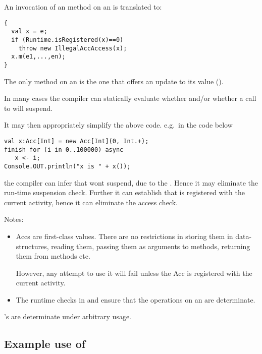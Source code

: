 An invocation  of an  method on an
 is translated to:
\begin{lstlisting}
{
  val x = e;
  if (Runtime.isRegistered(x)==0)
    throw new IllegalAccAccess(x);
  x.m(e1,...,en);
}
\end{lstlisting}

The only  method on an  is the one that offers an
update to its value ().

In many cases the compiler can statically evaluate whether
 and/or whether a call to
  will suspend.

It may then appropriately simplify the above code. e.g.{}~in the code below
\begin{lstlisting}
val x:Acc[Int] = new Acc[Int](0, Int.+);
finish for (i in 0..100000) async
   x <- i;
Console.OUT.println("x is " + x());
\end{lstlisting}
\noindent the compiler can infer that  wont suspend, due to
the . Hence it may eliminate the run-time suspension
check. Further it can establish that  is 
registered with the current activity, hence it can eliminate the
access check.

Notes:
\begin{itemize}
\item
   Accs are first-class values. There are no restrictions in storing
   them in data-structures, reading them, passing them as arguments to
   methods, returning them from methods etc.

   However, any attempt to use it will fail unless the Acc is
   registered with the current activity.

\item The runtime checks in  and
    ensure that the operations on an 
  are determinate.

\end{itemize}

\begin{proposition}
's are determinate under arbitrary usage.
\end{proposition}

\subsection{Example use of }
\begin{example}[Histogram]
\begin{lstlisting}

\end{lstlisting}
\end{example}

